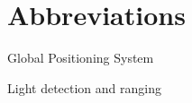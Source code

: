 \chapter*{Abbreviations}

\begin{description}
\setlength{\itemsep}{-11pt}
\setlength{\leftmargin}{900pt}

\item[GPS] Global Positioning System

\item[LIDAR] Light detection and ranging

\end{description}
